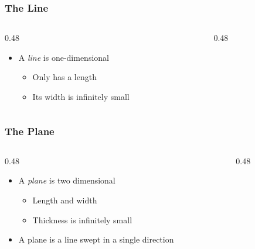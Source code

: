 \begin{frame}
	\frametitle{The Line}

    \begin{columns}
        \begin{column}{0.48\linewidth}
            \begin{itemize}[<+- | alert@+>]
                \item A \emph{line} is one-dimensional
                    \begin{itemize}
                        \item Only has a length
                        \item Its width is infinitely small
                    \end{itemize}                
            \end{itemize}
        \end{column}
        \begin{column}{0.48\linewidth}
            \centering
        \end{column}
    \end{columns}
\end{frame}

\begin{frame}
	\frametitle{The Plane}

    \begin{columns}
        \begin{column}{0.48\linewidth}
            \begin{itemize}[<+- | alert@+>]
                \item A \emph{plane} is two dimensional
                    \begin{itemize}
                        \item Length and width
                        \item Thickness is infinitely small
                    \end{itemize}
                \item A plane is a line swept in a single direction
            \end{itemize}
        \end{column}
        \begin{column}{0.48\linewidth}
            \centering
            \resizebox{\linewidth}{!}{
                
            }
        \end{column}
    \end{columns}
\end{frame}

